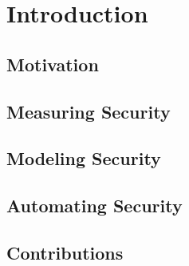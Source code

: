 \chapter{Introduction} \label{ch:intro}








\section{Motivation} \label{sec:intro:motivation}



\section{Measuring Security} \label{sec:intro:sys_sec}



\section{Modeling Security} \label{sec:intro:threat_modeling}



\section{Automating Security} \label{sec:intro:devsecops}



\section{Contributions}\label{sec:intro:contibutions}

